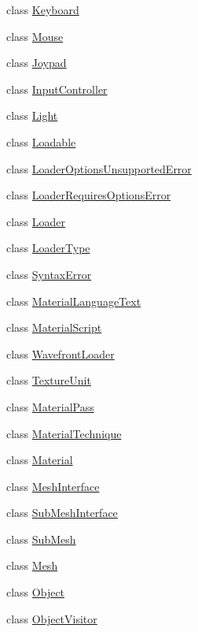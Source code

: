 \begin{DoxyCompactItemize}
class \hyperlink{classkglt_1_1_keyboard}{Keyboard}
\item 
class \hyperlink{classkglt_1_1_mouse}{Mouse}
\item 
class \hyperlink{classkglt_1_1_joypad}{Joypad}
\item 
class \hyperlink{classkglt_1_1_input_controller}{Input\-Controller}
\item 
class \hyperlink{classkglt_1_1_light}{Light}
\item 
class \hyperlink{classkglt_1_1_loadable}{Loadable}
\item 
class \hyperlink{classkglt_1_1_loader_options_unsupported_error}{Loader\-Options\-Unsupported\-Error}
\item 
class \hyperlink{classkglt_1_1_loader_requires_options_error}{Loader\-Requires\-Options\-Error}
\item 
class \hyperlink{classkglt_1_1_loader}{Loader}
\item 
class \hyperlink{classkglt_1_1_loader_type}{Loader\-Type}
\item 
class \hyperlink{classkglt_1_1_syntax_error}{Syntax\-Error}
\item 
class \hyperlink{classkglt_1_1_material_language_text}{Material\-Language\-Text}
\item 
class \hyperlink{classkglt_1_1_material_script}{Material\-Script}
\item 
class \hyperlink{classkglt_1_1_wavefront_loader}{Wavefront\-Loader}
\item 
class \hyperlink{classkglt_1_1_texture_unit}{Texture\-Unit}
\item 
class \hyperlink{classkglt_1_1_material_pass}{Material\-Pass}
\item 
class \hyperlink{classkglt_1_1_material_technique}{Material\-Technique}
\item 
class \hyperlink{classkglt_1_1_material}{Material}
\item 
class \hyperlink{classkglt_1_1_mesh_interface}{Mesh\-Interface}
\item 
class \hyperlink{classkglt_1_1_sub_mesh_interface}{Sub\-Mesh\-Interface}
\item 
class \hyperlink{classkglt_1_1_sub_mesh}{Sub\-Mesh}
\item 
class \hyperlink{classkglt_1_1_mesh}{Mesh}
\item 
class \hyperlink{classkglt_1_1_object}{Object}
\item 
class \hyperlink{classkglt_1_1_object_visitor}{Object\-Visitor}
\item 

\end{DoxyCompactItemize}
